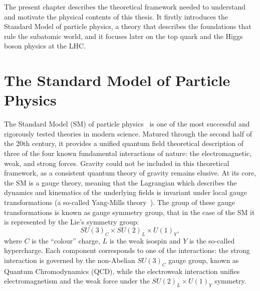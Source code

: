 The present chapter describes the theoretical framework needed to understand and motivate the physical contents of this thesis. 
It firstly introduces the Standard Model of particle physics, a theory that describes the foundations that rule the subatomic world, and it focuses later on the top quark and the Higgs boson physics at the LHC.

\section{The Standard Model of Particle Physics}
\label{sec:SM_intro}
The Standard Model (SM) of particle physics~\cite{Glashow,Weinberg,Salam} is one of the most successful and rigorously tested theories in modern science. Matured through the second half of the 20th century, it provides a unified quantum field theoretical description of three of the four known fundamental interactions of nature: the electromagnetic, weak, and strong forces. Gravity could not be included in this theoretical framework, as a consistent quantum theory of gravity remains elusive. 
At its core, the SM is a gauge theory, meaning that the Lagrangian which describes the dynamics and kinematics of the underlying fields is invariant under local gauge transformations (a so-called Yang-Mills theory~\cite{YMills}). The group of these gauge transformations is known as gauge symmetry group, that in the case of the SM it is represented by the Lie's symmetry group:
\begin{equation}
    SU(3)_C \times SU(2)_L \times U(1)_Y,
\end{equation}
where $C$ is the ``colour'' charge, $L$ is the weak isospin and $Y$ is the so-called hypercharge. Each component corresponds to one of the interactions: the strong interaction is governed by the non-Abelian $SU(3)_C$ gauge group, known as Quantum Chromodynamics (QCD), while the electroweak interaction unifies electromagnetism and the weak force under the $SU(2)_L \times U(1)_Y$ symmetry.

